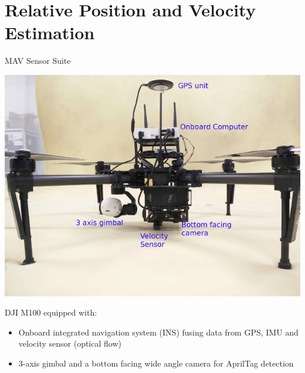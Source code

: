 \section{Relative Position and Velocity Estimation}

\begin{frame}{MAV Sensor Suite}
		\begin{center}
		\includegraphics[width=0.5\paperwidth]{figures/m100.jpg}
		\end{center}
		\vspace{-0.5cm}
		DJI M100 equipped with: 
		\begin{itemize}
			\item Onboard integrated navigation system (INS) fusing data from GPS, IMU and velocity sensor (optical flow)
			\item 3-axis gimbal and a bottom facing wide angle camera for AprilTag detection
		\end{itemize}
\end{frame}


